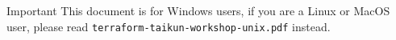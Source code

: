 \begin{warn}{Important}
  This document is for Windows users, if you are a Linux or MacOS user, please read \texttt{terraform-taikun-workshop-unix.pdf} instead.
\end{warn}
